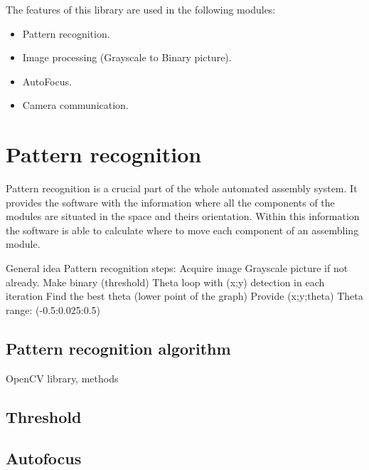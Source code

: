 The features of this library are used in the following modules:
\begin{itemize}
\setlength\itemsep{-0.5em}
\item Pattern recognition.
\item Image processing (Grayscale to Binary picture).
\item AutoFocus.
\item Camera communication.
\end{itemize}

\section{Pattern recognition}

Pattern recognition is a crucial part of the whole automated assembly system. It provides the software with the information where all the components of the modules are situated in the space and theirs orientation. Within this information the software is able to calculate where to move each component of an assembling module.



General idea
Pattern recognition steps:
Acquire image
Grayscale picture if not already.
Make binary (threshold)
Theta loop with (x;y) detection in each iteration
Find the best theta (lower point of the graph)
Provide (x;y;theta)
Theta range:
(-0.5:0.025:0.5)


\subsection{Pattern recognition algorithm}

OpenCV library, methods



\subsection{Threshold}



\subsection{Autofocus}







